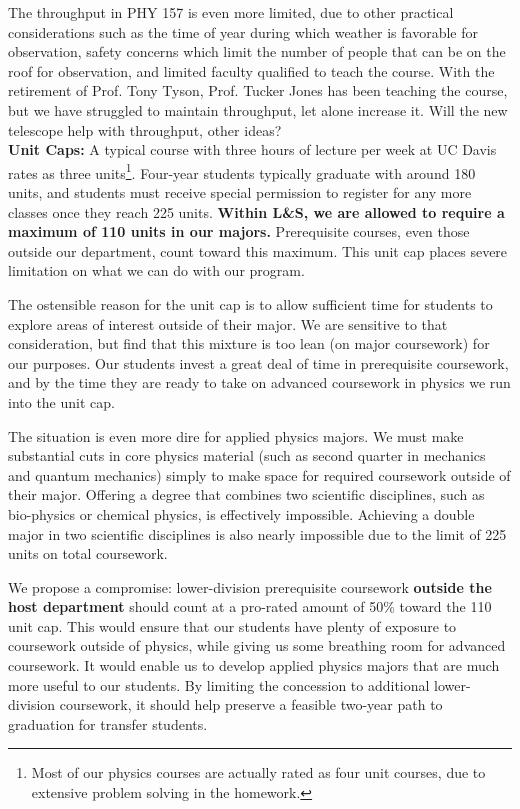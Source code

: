 \documentclass[12pt]{article}
\begin{document}
The throughput in PHY 157 is even more limited, due to other practical considerations such as the time of year during which weather is favorable for observation, safety concerns which limit the number of people
that can be on the roof for observation, and limited faculty qualified to teach the course.  With the retirement of Prof. Tony Tyson, Prof. Tucker Jones has been teaching the course, but we have struggled to maintain throughput, let alone increase it.  {\color{red} Will the new telescope help with throughput, other ideas?}\\[3pt]

\noindent
{\bf Unit Caps:}  A typical course with three hours of lecture per week at UC Davis rates as three units\footnote{Most of our physics courses are actually rated as four unit courses, due to extensive problem solving in the homework.}.  Four-year students typically graduate with around 180 units, and students must receive special permission to register for any more classes once they reach 225 units.
{\bf Within L\&S, we are allowed to require a maximum of 110 units in our majors.} Prerequisite courses, even those outside our department, count toward this maximum.  This unit cap places severe limitation on what we can do with our program.  

The ostensible reason for the unit cap is to allow sufficient time for students to explore areas of interest outside of their major.  We are sensitive to that consideration, but find that this mixture is too lean (on major coursework) for our purposes.  Our students invest a great deal of time in prerequisite coursework, and by the time they are ready to take on advanced coursework in physics we run into the unit cap.  

The situation is even more dire for applied physics majors.  We must make substantial cuts in core physics material (such as second quarter in mechanics and quantum mechanics) simply to make space for required coursework outside of their major.  Offering a degree that combines two scientific disciplines, such as bio-physics or chemical physics, is effectively impossible.  Achieving a double major in two scientific disciplines is also nearly impossible due to the limit of 225 units on total coursework.

We propose a compromise:  lower-division prerequisite coursework {\bf outside the host department} should count at a pro-rated amount of 50\% toward the 110 unit cap.  This would ensure that our students have plenty of exposure to coursework outside of physics, while giving us some breathing room for advanced coursework.  It would enable us to develop applied physics majors that are much more useful to our students.  By limiting the concession to additional lower-division coursework, it should help preserve a feasible two-year path to graduation for transfer students.
\end{document}
